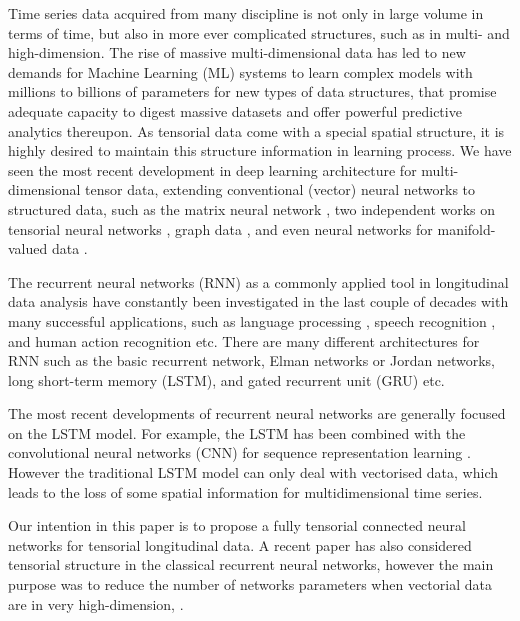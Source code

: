 \documentclass[journal]{IEEEtran}
\begin{document}
Time series data acquired from many discipline is not only in large volume  in terms of time, but also in more ever complicated structures, such as in multi- and high-dimension.  The rise of massive multi-dimensional data has led to new demands for Machine Learning (ML) systems to learn complex models with millions to billions of parameters for new types of data structures, that promise adequate capacity to digest massive datasets and offer powerful predictive analytics thereupon. As tensorial data come with a special spatial structure, it is highly desired to maintain this structure information in learning process. We have seen the most recent development in deep learning architecture for multi-dimensional tensor data, extending conventional (vector) neural networks to structured data, such as the matrix neural network \cite{GaoGuoWang2017,IonescuVantzosSminchisescu2015a}, two independent works on tensorial neural networks \cite{BaiZhangGao2017,ChienBao2017}, graph data \cite{LiTarlowBrockschmidtZemel2016,SeoDefferrardVandergheynstBresson2017}, and even neural networks for manifold-valued data \cite{HuangGool2017}.

 

The recurrent neural networks (RNN) as a commonly applied tool in longitudinal data analysis have constantly been investigated in the last couple of decades with many successful applications, such as language processing \cite{MulderBethardMoens2015}, speech recognition \cite{GravesMohamedHinton2013}, and human action recognition \cite{LiuShahroudyXuWang2016,ZhangLanXingZengXueZheng2017} etc. There are many different architectures for RNN such as the basic recurrent network,   Elman networks or Jordan networks,  long short-term memory (LSTM), and gated recurrent unit (GRU) etc.  %

The most recent developments of recurrent neural networks are generally focused on the LSTM model. For example, the LSTM has been combined with the convolutional neural networks (CNN) for sequence representation learning \cite{GanyPuyHenaoyLiyHezCarin2016}. However the traditional LSTM model can only deal with vectorised data, which leads to the loss of some spatial information for multidimensional time series. 

Our intention in this paper is to propose a fully tensorial connected neural networks for tensorial longitudinal data. A recent paper has also considered tensorial structure in the classical recurrent neural networks, however the main purpose was to reduce the number of networks parameters when vectorial data are in very high-dimension, \cite{JoseCisseFleuret2017}.
\end{document}
